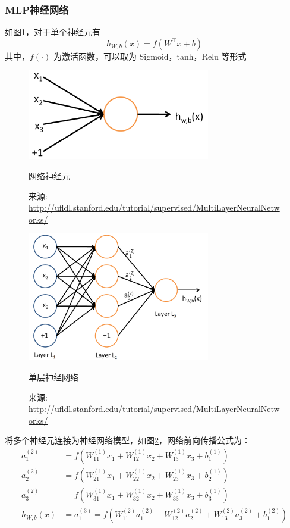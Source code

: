 \subsubsection{MLP神经网络}
	如图\ref{fig:sn}，对于单个神经元有
	\begin{equation}
	h_{W,b}(x)=f(W^\top x+b)
	\end{equation}
	其中，$f(\cdot)$ 为激活函数，可以取为 {\ttfamily Sigmoid，tanh，Relu} 等形式
	\begin{figure}[htbp]
	\centering
	\includegraphics[width=8cm]{resource/SingleNeuron.png}
	\caption{网络神经元}
	\caption*{\small 来源: \url{http://ufldl.stanford.edu/tutorial/supervised/MultiLayerNeuralNetworks/}}
	\label{fig:sn}
	\end{figure}

	\begin{figure}[htbp]
	\centering
	\includegraphics[width=8cm]{resource/Network331.png}
	\caption{单层神经网络}
	\caption*{\small 来源: \url{http://ufldl.stanford.edu/tutorial/supervised/MultiLayerNeuralNetworks/}}
	\label{fig:n331}
	\end{figure}

	将多个神经元连接为神经网络模型，如图\ref{fig:n331}，网络前向传播公式为：
	\begin{align}
	a_1^{(2)} &= f(W_{11}^{(1)}x_1 + W_{12}^{(1)} x_2 + W_{13}^{(1)} x_3 + b_1^{(1)})  \\
	a_2^{(2)} &= f(W_{21}^{(1)}x_1 + W_{22}^{(1)} x_2 + W_{23}^{(1)} x_3 + b_2^{(1)})  \\
	a_3^{(2)} &= f(W_{31}^{(1)}x_1 + W_{32}^{(1)} x_2 + W_{33}^{(1)} x_3 + b_3^{(1)})  \\
	h_{W,b}(x) &= a_1^{(3)} =  f(W_{11}^{(2)}a_1^{(2)} + W_{12}^{(2)} a_2^{(2)} + W_{13}^{(2)} a_3^{(2)} + b_1^{(2)})
	\end{align}

